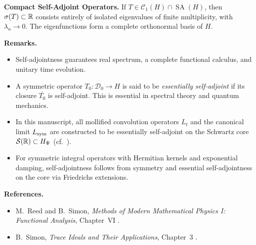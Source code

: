 \begin{definition}
\medskip
\noindent\textbf{Compact Self-Adjoint Operators.}
If \( T \in \mathcal{C}_1(H) \cap \operatorname{SA}(H) \), then \( \sigma(T) \subset \mathbb{R} \) consists entirely of isolated eigenvalues of finite multiplicity, with \( \lambda_n \to 0 \). The eigenfunctions form a complete orthonormal basis of \( H \).

\medskip
\noindent\textbf{Remarks.}
\begin{itemize}
    \item Self-adjointness guarantees real spectrum, a complete functional calculus, and unitary time evolution.
    \item A symmetric operator \( T_0 \colon \mathcal{D}_0 \to H \) is said to be \emph{essentially self-adjoint} if its closure \( \overline{T_0} \) is self-adjoint. This is essential in spectral theory and quantum mechanics.
    \item In this manuscript, all mollified convolution operators \( L_t \) and the canonical limit \( L_{\mathrm{sym}} \) are constructed to be essentially self-adjoint on the Schwartz core \( \mathcal{S}(\mathbb{R}) \subset H_{\Psi} \) (cf.~).
    \item For symmetric integral operators with Hermitian kernels and exponential damping, self-adjointness follows from symmetry and essential self-adjointness on the core via Friedrichs extensions.
\end{itemize}

\medskip
\noindent\textbf{References.}
\begin{itemize}
    \item M.~Reed and B.~Simon, \emph{Methods of Modern Mathematical Physics I: Functional Analysis}, Chapter~VI \cite{ReedSimon1980I}.
    \item B.~Simon, \emph{Trace Ideals and Their Applications}, Chapter~3 \cite{Simon2005TraceIdeals}.
\end{itemize}
\end{definition}
